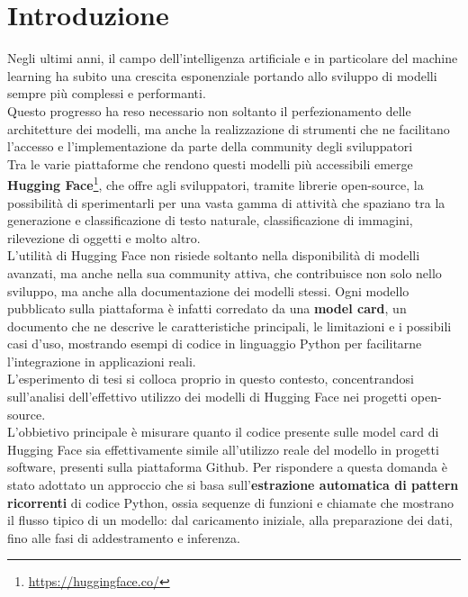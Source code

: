 \documentclass{article}
\begin{document}
\section{Introduzione}
Negli ultimi anni, il campo dell'intelligenza artificiale e in particolare del machine learning ha subito una crescita esponenziale portando allo sviluppo di modelli sempre più complessi e performanti.\\
Questo progresso ha reso necessario non soltanto il perfezionamento delle architetture dei modelli, ma anche la realizzazione di strumenti che ne facilitano l'accesso e l'implementazione da parte della community degli sviluppatori\\
Tra le varie piattaforme che rendono questi modelli più accessibili emerge \textbf{Hugging Face}\footnote{\url{https://huggingface.co/}}, che offre agli sviluppatori, tramite librerie open-source, la possibilità di sperimentarli per una vasta gamma di attività che spaziano tra la generazione e classificazione di testo naturale, classificazione di immagini, rilevezione di oggetti e molto altro.\\
L'utilità di Hugging Face non risiede soltanto nella disponibilità di modelli avanzati, ma anche nella sua community attiva, che contribuisce non solo nello sviluppo, ma anche alla documentazione dei modelli stessi. Ogni modello pubblicato sulla piattaforma è infatti corredato da una \textbf{model card}, un documento che ne descrive le caratteristiche principali, le limitazioni e i possibili casi d’uso, mostrando esempi di codice in linguaggio Python per facilitarne l’integrazione in applicazioni reali.\\
L'esperimento di tesi si colloca proprio in questo contesto, concentrandosi sull’analisi dell’effettivo utilizzo dei modelli di Hugging Face nei progetti open-source.\\
L'obbietivo principale è misurare quanto il codice presente sulle model card di Hugging Face sia effettivamente simile all'utilizzo reale del modello in progetti software, presenti sulla piattaforma Github. Per rispondere a questa domanda è stato adottato un approccio che si basa sull'\textbf{estrazione automatica di pattern ricorrenti} di codice Python, ossia sequenze di funzioni e chiamate che mostrano il flusso tipico di un modello: dal caricamento iniziale, alla preparazione dei dati, fino alle fasi di addestramento e inferenza.\\
\end{document}

